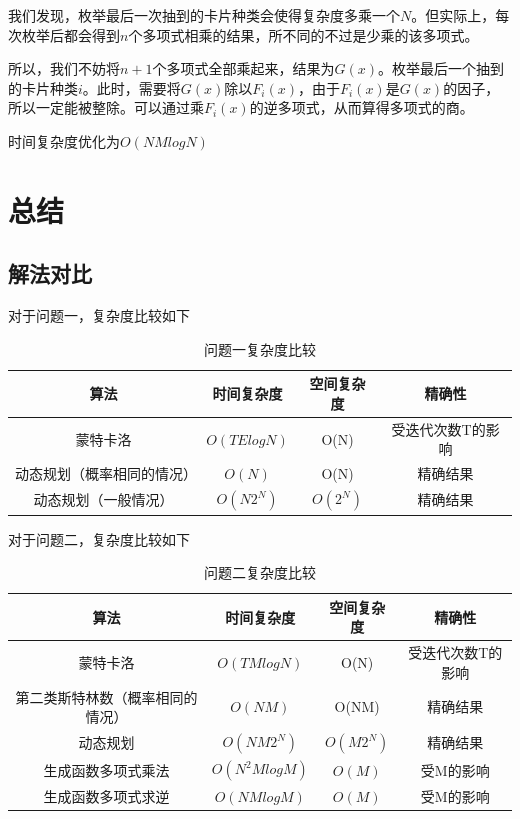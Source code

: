 \documentclass[master]{thesis-uestc}
\begin{document}
我们发现，枚举最后一次抽到的卡片种类会使得复杂度多乘一个$N$。但实际上，每次枚举后都会得到$n$个多项式相乘的结果，所不同的不过是少乘的该多项式。

所以，我们不妨将$n+1$个多项式全部乘起来，结果为$G(x)$。枚举最后一个抽到的卡片种类$i$。此时，需要将$G(x)$除以$F_i(x)$，由于$F_i(x)$是$G(x)$的因子，所以一定能被整除。可以通过乘$F_i(x)$的逆多项式，从而算得多项式的商。

时间复杂度优化为$O(NMlogN)$

\chapter{总结}

\section{解法对比}

对于问题一，复杂度比较如下


\begin{table}[h]
    \caption{问题一复杂度比较}
    \begin{tabular}{|c|c|c|c|}
    \hline
    算法 & 时间复杂度 & 空间复杂度 & 精确性 \\
    \hline
    蒙特卡洛 & $O(TElogN)$ & O(N) & 受迭代次数T的影响\\
    \hline
    动态规划（概率相同的情况） & $O(N)$ & O(N) & 精确结果 \\
    \hline
    动态规划（一般情况） & $O(N2^N)$ & $O(2^N)$ & 精确结果 \\
    \hline
    \end{tabular}
    \label{tablea}
    \end{table}

    对于问题二，复杂度比较如下


\begin{table}[h]
    \caption{问题二复杂度比较}
    \begin{tabular}{|c|c|c|c|}
    \hline
    算法 & 时间复杂度 & 空间复杂度 & 精确性 \\
    \hline
    蒙特卡洛 & $O(TMlogN)$ & O(N) & 受迭代次数T的影响\\
    \hline
    第二类斯特林数（概率相同的情况） & $O(NM)$ & O(NM) & 精确结果 \\
    \hline
    动态规划 & $O(NM2^N)$ & $O(M2^N)$ & 精确结果 \\
    \hline
    生成函数多项式乘法 & $O(N^2MlogM)$ & $O(M)$ & 受M的影响 \\
    \hline
    生成函数多项式求逆 & $O(NMlogM)$ & $O(M)$ & 受M的影响 \\
    \hline
    \end{tabular}
    \label{tablea}
    \end{table}
\end{document}
